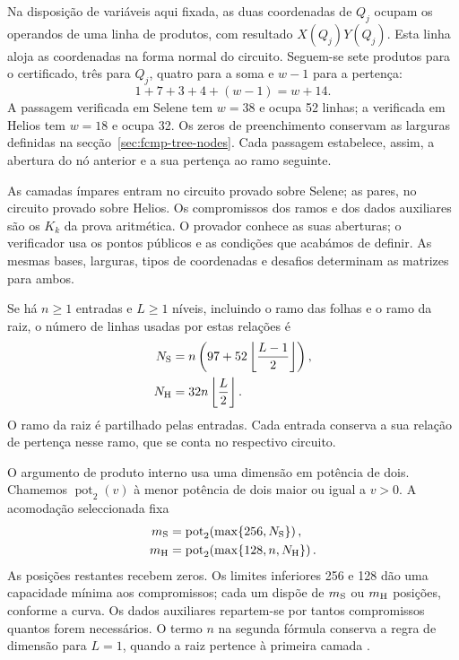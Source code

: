 Na disposição de variáveis aqui fixada, as duas coordenadas
de \(Q_j\) ocupam os operandos de uma linha de produtos,
com resultado \(X(Q_j)Y(Q_j)\). Esta linha aloja as
coordenadas na forma normal do circuito. Seguem-se sete
produtos para o certificado, três para \(Q_j\), quatro
para a soma e \(w-1\) para a pertença:
\[
 1+7+3+4+(w-1)=w+14.
\]
A passagem verificada em Selene tem \(w=38\) e ocupa
52 linhas; a verificada em Helios tem \(w=18\) e ocupa
32. Os zeros de preenchimento conservam as larguras
definidas na secção~\ref{sec:fcmp-tree-nodes}.
Cada passagem estabelece, assim, a abertura do nó anterior
e a sua pertença ao ramo seguinte.


As camadas ímpares entram no circuito provado sobre Selene;
as pares, no circuito provado sobre Helios. Os compromissos
dos ramos e dos dados auxiliares são os \(K_k\) da prova
aritmética. O provador conhece as suas aberturas; o verificador
usa os pontos públicos e as condições que acabámos de definir.
As mesmas bases, larguras, tipos de coordenadas e desafios
determinam as matrizes para ambos.

Se há \(n\geq1\) entradas e \(L\geq1\) níveis,
incluindo o ramo das folhas e o ramo da raiz, o número
de linhas usadas por estas relações é
\begin{equation}
 \begin{aligned}
 N_{\rm S}&=n\left(97+52\left\lfloor\frac{L-1}{2}\right\rfloor\right),\\
 N_{\rm H}&=32n\left\lfloor\frac L2\right\rfloor.
 \end{aligned}
 \label{eq:fcmp-circuit-row-counts}
\end{equation}
O ramo da raiz é partilhado pelas entradas. Cada entrada
conserva a sua relação de pertença nesse ramo, que se conta
no respectivo circuito.

O argumento de produto interno usa uma dimensão em potência
de dois. Chamemos \(\operatorname{pot}_2(v)\) à menor
potência de dois maior ou igual a \(v>0\). A acomodação
seleccionada fixa
\begin{equation}
 \begin{aligned}
 m_{\rm S}&=\operatorname{pot}_2\!\left(\max\{256,N_{\rm S}\}\right),\\
 m_{\rm H}&=\operatorname{pot}_2\!\left(\max\{128,n,N_{\rm H}\}\right).
 \end{aligned}
 \label{eq:fcmp-ipa-dimensions}
\end{equation}
As posições restantes recebem zeros. Os limites inferiores
256 e 128 dão uma capacidade mínima aos compromissos;
cada um dispõe de \(m_{\rm S}\) ou \(m_{\rm H}\) posições,
conforme a curva. Os dados auxiliares repartem-se por tantos
compromissos quantos forem necessários. O termo \(n\)
na segunda fórmula conserva a regra de dimensão para
\(L=1\), quando a raiz pertence à primeira camada
\cite{monero-oxide-fcmp-source}.

